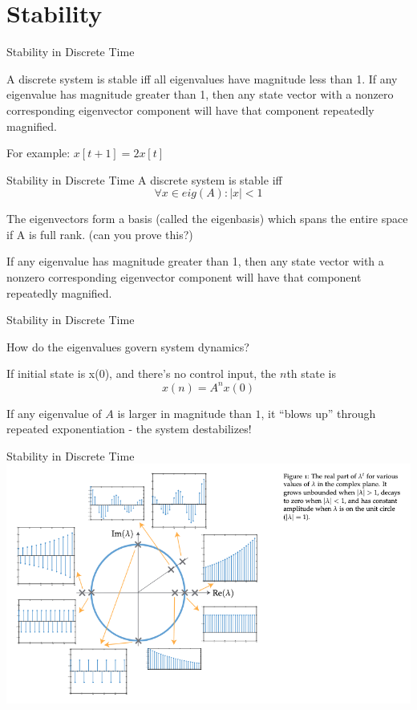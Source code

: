 \section{Stability}

\begin{frame}{Stability in Discrete Time}

A discrete system is stable iff all eigenvalues have magnitude less than 1. If any eigenvalue has magnitude greater than 1, then any state vector with a nonzero corresponding eigenvector component will have that component repeatedly magnified.

    For example: \(x[t+1] = 2 x[t]\)

\end{frame}

\begin{frame}{Stability in Discrete Time}
A discrete system is stable iff
    \[
        \forall x \in eig(A) : |x| < 1
    \]

The eigenvectors form a basis (called the eigenbasis) which spans the entire space if A is full rank. (can you prove this?)

If any eigenvalue has magnitude greater than 1, then any state vector with a nonzero corresponding eigenvector component will have that component repeatedly magnified.
\end{frame}

\begin{frame}{Stability in Discrete Time}

How do the eigenvalues govern system dynamics?

    If initial state is x(0), and there's no control input, the \(n\)th state is
    \[
        x(n) = A^n x(0)
    \]

    If any eigenvalue of \(A\) is larger in magnitude than \(1\), it ``blows up'' through repeated exponentiation - the system destabilizes!
\end{frame}

\begin{frame}{Stability in Discrete Time}
    \includegraphics[width=\textwidth]{./images/eigenvalues-on-the-unit-circle}
\end{frame}

